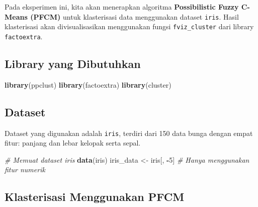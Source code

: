 \documentclass[
  oneside]{book}
\newenvironment{Shaded}{\begin{snugshade}}{\end{snugshade}}
\newcommand{\CommentTok}[1]{\textcolor[rgb]{0.56,0.35,0.01}{\textit{#1}}}
\newcommand{\DecValTok}[1]{\textcolor[rgb]{0.00,0.00,0.81}{#1}}
\newcommand{\FunctionTok}[1]{\textcolor[rgb]{0.13,0.29,0.53}{\textbf{#1}}}
\newcommand{\NormalTok}[1]{#1}
\newcommand{\OtherTok}[1]{\textcolor[rgb]{0.56,0.35,0.01}{#1}}
\newcommand{\SpecialCharTok}[1]{\textcolor[rgb]{0.81,0.36,0.00}{\textbf{#1}}}
\begin{document}
Pada eksperimen ini, kita akan menerapkan algoritma \textbf{Possibilistic Fuzzy C-Means (PFCM)} untuk klasterisasi data menggunakan dataset \texttt{iris}. Hasil klasterisasi akan divisualisasikan menggunakan fungsi \texttt{fviz\_cluster} dari library \texttt{factoextra}.

\subsection*{Library yang Dibutuhkan}\label{library-yang-dibutuhkan}

\begin{Shaded}
\begin{Highlighting}[]
\FunctionTok{library}\NormalTok{(ppclust)}
\FunctionTok{library}\NormalTok{(factoextra)}
\FunctionTok{library}\NormalTok{(cluster)}
\end{Highlighting}
\end{Shaded}

\subsection*{Dataset}\label{dataset-1}

Dataset yang digunakan adalah \texttt{iris}, terdiri dari 150 data bunga dengan empat fitur: panjang dan lebar kelopak serta sepal.

\begin{Shaded}
\begin{Highlighting}[]
\CommentTok{\# Memuat dataset iris}
\FunctionTok{data}\NormalTok{(iris)}
\NormalTok{iris\_data }\OtherTok{\textless{}{-}}\NormalTok{ iris[, }\SpecialCharTok{{-}}\DecValTok{5}\NormalTok{] }\CommentTok{\# Hanya menggunakan fitur numerik}
\end{Highlighting}
\end{Shaded}

\subsection*{Klasterisasi Menggunakan PFCM}\label{klasterisasi-menggunakan-pfcm}
\end{document}
